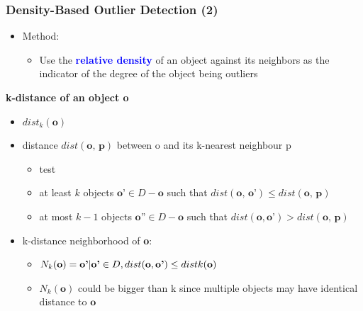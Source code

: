\documentclass[aspectratio=169,t,xcolor=dvipsnames]{beamer}
\newcommand{\blue}[1]{\textbf{\textcolor{blue}{#1}}}
\begin{document}
\begin{frame}
	\frametitle{Density-Based Outlier Detection (2)}
		
	\begin{itemize}
		\item Method:
		      \begin{itemize}
		      	\item Use the \blue{relative density} of an object against its neighbors as the indicator of the degree of the object being outliers
		      \end{itemize}
	\end{itemize}
	 \textbf{\alert{k-distance} of an object \textbf{\alert{o}}}
	\begin{itemize}
		\item $dist_k(\textbf{o})$
		\item distance $dist(\textbf{o, p})$ between o and its k-nearest neighbour \alert{p}
		      \begin{itemize}
		      \item test
		      	\item at least $k$ objects $\textbf{o'} \in D - {\textbf{o}}$ such that $dist(\textbf{o, o'}) \leq dist(\textbf{o, p})$
		      	\item at most $k - 1$ objects $\textbf{o''} \in D - {\textbf{o}}$ such that $dist(\textbf{o}, \textbf{o'}) > dist(\textbf{o, p})$
		      \end{itemize}
		\item \alert{k-distance neighborhood of \textbf{o}}:
		      \begin{itemize}
		      	\item $N_k(\textbf{o}) = {\textbf{\textbf{o'}} | \textbf{o'} \in D, dist(\textbf{o}, \textbf{o'}) \leq distk(\textbf{o})}$
		      	\item $N_k(\textbf{o})$ could be bigger than k since multiple objects may have identical distance to $\textbf{o}$
		      \end{itemize}
	\end{itemize}
\end{frame}
\end{document}
